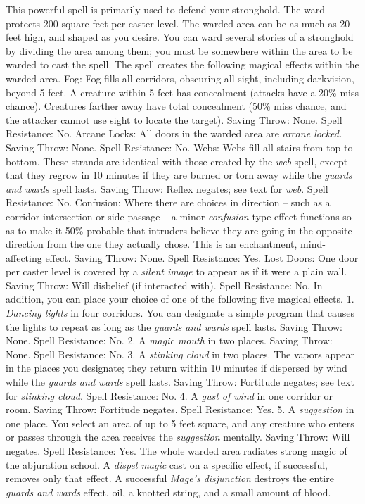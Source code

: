 This powerful spell is primarily used to defend your stronghold. The ward protects
200 square feet per caster level. The warded area can be as much as 20 feet high,
and shaped as you desire. You can ward several stories of a stronghold by dividing
the area among them; you must be somewhere within the area to be warded to cast
the spell. The spell creates the following magical effects within the warded area.
Fog: Fog fills all corridors, obscuring all sight, including darkvision,
beyond 5 feet. A creature within 5 feet has concealment (attacks have a 20\% miss
chance). Creatures farther away have total concealment (50\% miss chance, and the
attacker cannot use sight to locate the target). Saving Throw: None. Spell Resistance:
No.
Arcane Locks: All doors in the warded area are \textit{arcane locked.
}Saving Throw: None. Spell Resistance: No.
Webs: Webs fill all stairs from top to bottom. These strands are identical
with those created by the \textit{web} spell, except that they regrow in 10 minutes
if they are burned or torn away while the \textit{guards and wards} spell lasts.
Saving Throw: Reflex negates; see text for \textit{web}. Spell Resistance: No.
Confusion: Where there are choices in direction -- such as a corridor intersection
or side passage -- a minor \textit{confusion-}type effect functions so as to make
it 50\% probable that intruders believe they are going in the opposite direction
from the one they actually chose. This is an enchantment, mind-affecting effect.
Saving Throw: None. Spell Resistance: Yes.
Lost Doors: One door per caster level is covered by a \textit{silent image
}to appear as if it were a plain wall. Saving Throw: Will disbelief (if interacted
with). Spell Resistance: No.
In addition, you can place your choice of one of the following five magical effects.
1. \textit{Dancing lights} in four corridors. You can designate a simple program
that causes the lights to repeat as long as the \textit{guards and wards} spell
lasts. Saving Throw: None. Spell Resistance: No.
2. A \textit{magic mouth} in two places. Saving Throw: None. Spell Resistance:
No.
3. A \textit{stinking cloud} in two places. The vapors appear in the places you
designate; they return within 10 minutes if dispersed by wind while the \textit{guards
and wards} spell lasts. Saving Throw: Fortitude negates; see text for \textit{stinking
cloud}. Spell Resistance: No.
4. A \textit{gust of wind} in one corridor or room. Saving Throw: Fortitude negates.
Spell Resistance: Yes.
5. A \textit{suggestion} in one place. You select an area of up to 5 feet square,
and any creature who enters or passes through the area receives the \textit{suggestion
}mentally. Saving Throw: Will negates. Spell Resistance: Yes.
The whole warded area radiates strong magic of the abjuration school. A \textit{dispel
magic} cast on a specific effect, if successful, removes only that effect. A successful
\textit{Mage's disjunction} destroys the entire \textit{guards and wards} effect.
oil, a knotted string, and a small amount of blood.